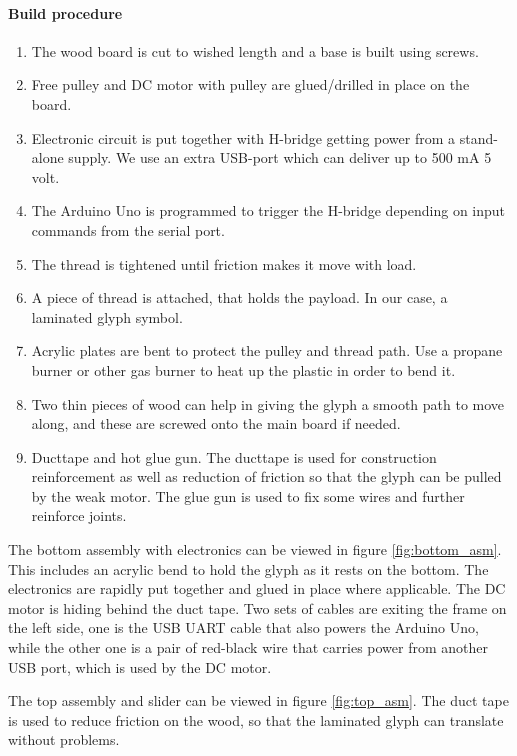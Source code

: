 \paragraph{Build procedure}
\begin{enumerate}  
        \item The wood board is cut to wished length and a base is built using screws.
        \item Free pulley and DC motor with pulley are glued/drilled in place on the board.
        \item Electronic circuit is put together with H-bridge getting power from a stand-alone supply. We use an extra USB-port which can deliver up to 500 mA 5 volt.
        \item The Arduino Uno is programmed to trigger the H-bridge depending on input commands from the serial port.
        \item The thread is tightened until friction makes it move with load.
        \item A piece of thread is attached, that holds the payload. In our case, a laminated glyph symbol.
        \item Acrylic plates are bent to protect the pulley and thread path. Use a propane burner or other gas burner to heat up the plastic in order to bend it.
        \item Two thin pieces of wood can help in giving the glyph a smooth path to move along, and these are screwed onto the main board if needed.
        \item Ducttape and hot glue gun. The ducttape is used for construction reinforcement as well as reduction of friction so that the glyph can be pulled by the weak motor. The glue gun is used to fix some wires and further reinforce joints.
\end{enumerate}

The bottom assembly with electronics can be viewed in figure \ref{fig:bottom_asm}. This includes an acrylic bend to hold the glyph as it rests on the bottom. The electronics are rapidly put together and glued in place where applicable. The DC motor is hiding behind the duct tape. Two sets of cables are exiting the frame on the left side, one is the USB UART cable that also powers the Arduino Uno, while the other one is a pair of red-black wire that carries power from another USB port, which is used by the DC motor.

The top assembly and slider can be viewed in figure \ref{fig:top_asm}. The duct tape is used to reduce friction on the wood, so that the laminated glyph can translate without problems.

